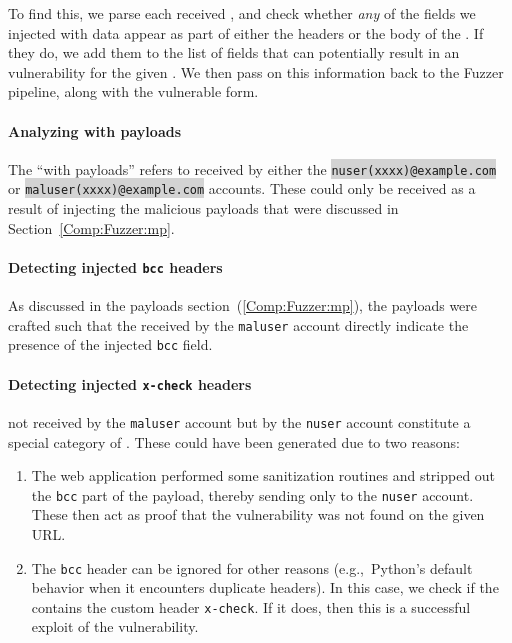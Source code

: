 To find this, we parse each received \email, and check whether \emph{any} of the fields we injected with data appear as part of either the headers or the body of the \email. If they do, we add them to the list of fields that can potentially result in an \ehi vulnerability for the given \email. We then pass on this information back to the Fuzzer pipeline, along with the vulnerable form.

\paragraph{Analyzing \email with payloads}
The ``\emails with payloads'' refers to \emails received by either the \colorbox{lightgray}{\lstinline{nuser(xxxx)@example.com}} or \colorbox{lightgray}{\lstinline{maluser(xxxx)@example.com}} accounts. These \emails could only be received as a result of injecting the malicious payloads that were discussed in Section~\ref{Comp:Fuzzer:mp}. 

\paragraph{Detecting injected \texttt{bcc} headers}
As discussed in the payloads section~(\ref{Comp:Fuzzer:mp}), the payloads were crafted such that the \emails received by the \texttt{maluser} account directly indicate the presence of the injected \texttt{bcc} field. 

\label{analyze:detect_x_check}
\paragraph{Detecting injected \texttt{x-check} headers}
\Emails not received by the \texttt{maluser} account but by the \texttt{nuser} account constitute a special category of \emails.
These \emails could have been generated due to two reasons:
\begin{enumerate}
	\item The web application performed some sanitization routines and stripped out the \texttt{bcc} part of the payload, thereby sending \emails only to the \texttt{nuser} account. These \emails then act as proof that the vulnerability was not found on the given URL.
	\item The \texttt{bcc} header can be ignored for other reasons (e.g.,\ Python's default behavior when it encounters duplicate headers). In this case, we check if the \email contains the custom header \texttt{x-check}. If it does, then this is a successful exploit of the vulnerability.
\end{enumerate}

